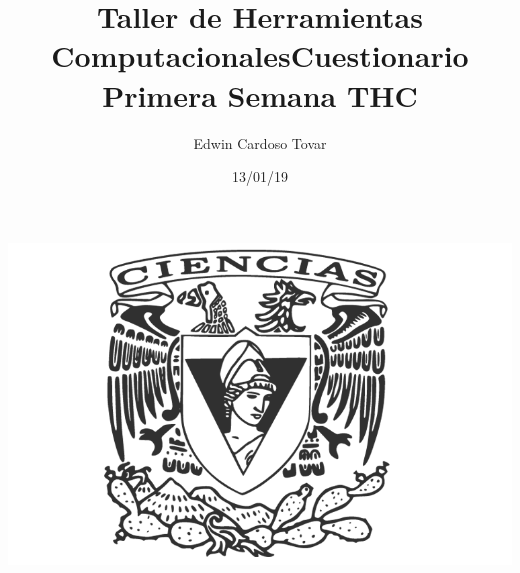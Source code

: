 \documentclass[letterpaper, 12pt, oneside]{article}%
\title{\Huge Taller de Herramientas Computacionales}
\author{Edwin Cardoso Tovar}%
\date{13/01/19}%
\begin{document}
\maketitle
\begin{center}%
\includegraphics[scale=0.40]{1.png}%
\end{center}%
\newpage%

\title{\Huge Cuestionario Primera Semana THC\\}%
\end{document}
